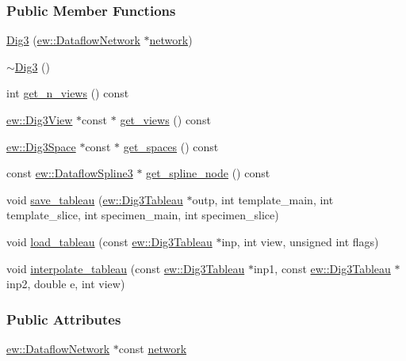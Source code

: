 \subsubsection*{Public Member Functions}
\begin{DoxyCompactItemize}
\item 
\hyperlink{classew_1_1Dig3_aabdbcd7bda62dda77dfa195023578051}{Dig3} (\hyperlink{classew_1_1DataflowNetwork}{ew::DataflowNetwork} $\ast$\hyperlink{classew_1_1Dig3_a94c1e034e60f4ca25cff64ee88ca86ab}{network})
\item 
\hyperlink{classew_1_1Dig3_a837f1989dfa80f5bf22eecafb055bf5c}{$\sim$Dig3} ()
\item 
int \hyperlink{classew_1_1Dig3_a44fe876fbf8342d6edd2355729afc495}{get\_\-n\_\-views} () const 
\item 
\hyperlink{classew_1_1Dig3View}{ew::Dig3View} $\ast$const $\ast$ \hyperlink{classew_1_1Dig3_a5ddec0535d0680a0b37616dbc4eee042}{get\_\-views} () const 
\item 
\hyperlink{classew_1_1Dig3Space}{ew::Dig3Space} $\ast$const $\ast$ \hyperlink{classew_1_1Dig3_ad8f02ea649e872543988eaf56ac8858f}{get\_\-spaces} () const 
\item 
const \hyperlink{classew_1_1DataflowSpline3}{ew::DataflowSpline3} $\ast$ \hyperlink{classew_1_1Dig3_ab163ea18f43b5c753b1b18b1523b4886}{get\_\-spline\_\-node} () const 
\item 
void \hyperlink{classew_1_1Dig3_a805ae977646c8b6c3bd1bff65c700569}{save\_\-tableau} (\hyperlink{classew_1_1Dig3Tableau}{ew::Dig3Tableau} $\ast$outp, int template\_\-main, int template\_\-slice, int specimen\_\-main, int specimen\_\-slice)
\item 
void \hyperlink{classew_1_1Dig3_aa20f2ab4ae20bfa1600ff4a32fbb2182}{load\_\-tableau} (const \hyperlink{classew_1_1Dig3Tableau}{ew::Dig3Tableau} $\ast$inp, int view, unsigned int flags)
\item 
void \hyperlink{classew_1_1Dig3_a9683b9f765ca282b010431c4e8b1888d}{interpolate\_\-tableau} (const \hyperlink{classew_1_1Dig3Tableau}{ew::Dig3Tableau} $\ast$inp1, const \hyperlink{classew_1_1Dig3Tableau}{ew::Dig3Tableau} $\ast$inp2, double e, int view)
\end{DoxyCompactItemize}
\subsubsection*{Public Attributes}
\begin{DoxyCompactItemize}
\item 
\hyperlink{classew_1_1DataflowNetwork}{ew::DataflowNetwork} $\ast$const \hyperlink{classew_1_1Dig3_a94c1e034e60f4ca25cff64ee88ca86ab}{network}
\end{DoxyCompactItemize}



